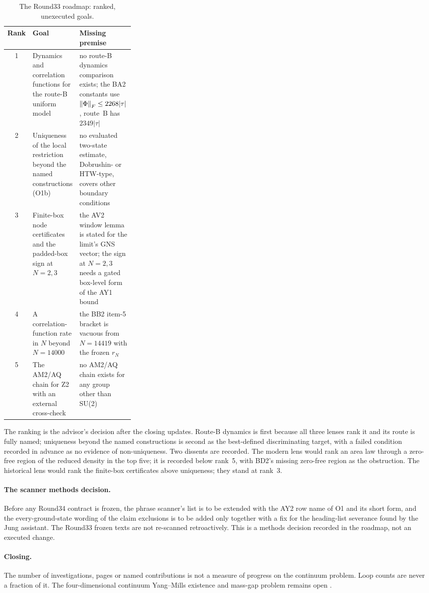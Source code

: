 \begin{table}[htbp]
\centering\small
\caption{The Round33 roadmap: ranked, unexecuted goals.}
\label{tab:limits-roadmap}
\begin{tabularx}{\linewidth}{@{}c>{\raggedright\arraybackslash}p{0.3\linewidth}>{\raggedright\arraybackslash}X@{}}
\toprule
Rank & Goal & Missing premise\\
\midrule
1 & Dynamics and correlation functions for the route-B uniform model & no route-B dynamics comparison exists; the BA2 constants use $\left\lVert\Phi\right\rVert_F\le2268|\tau|$, route~B has $2349|\tau|$\\
2 & Uniqueness of the local restriction beyond the named constructions (O1b) & no evaluated two-state estimate, Dobrushin- or HTW-type, covers other boundary conditions\\
3 & Finite-box node certificates and the padded-box sign at $N=2,3$ & the AV2 window lemma is stated for the limit's GNS vector; the sign at $N=2,3$ needs a gated box-level form of the AY1 bound\\
4 & A correlation-function rate in $N$ beyond $N=14000$ & the BB2 item-5 bracket is vacuous from $N=14419$ with the frozen $r_N$\\
5 & The AM2/AQ chain for Z2 with an external cross-check & no AM2/AQ chain exists for any group other than SU(2)\\
\bottomrule
\end{tabularx}
\end{table}

The ranking is the advisor's decision after the closing updates. Route-B
dynamics is first because all three lenses rank it and its route is fully
named; uniqueness beyond the named constructions is second as the
best-defined discriminating target, with a failed condition recorded in
advance as no evidence of non-uniqueness. Two dissents are recorded. The
modern lens would rank an area law through a zero-free region of the reduced
density in the top five; it is recorded below rank~5, with BD2's missing
zero-free region as the obstruction. The historical lens would rank the
finite-box certificates above uniqueness; they stand at rank~3.

\paragraph{The scanner methods decision.} Before any Round34 contract is
frozen, the phrase scanner's list is to be extended with the AY2 row name of
O1 and its short form, and the every-ground-state wording of the claim
exclusions is to be added only together with a fix for the heading-list
severance found by the Jung assistant. The Round33 frozen texts are not
re-scanned retroactively. This is a methods decision recorded in the roadmap,
not an executed change.

\paragraph{Closing.} The number of investigations, pages or named
contributions is not a measure of progress on the continuum problem. Loop
counts are never a fraction of it. The four-dimensional continuum
Yang--Mills existence and mass-gap problem remains open \cite{clay}.
